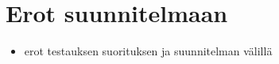 \section{Erot suunnitelmaan}

\begin{itemize}
	\item erot testauksen suorituksen ja suunnitelman välillä
\end{itemize}